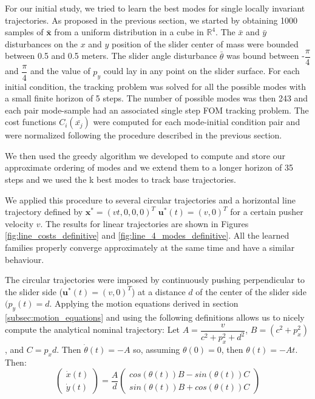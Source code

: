\documentclass[12,twoside]{TFG-GM}
\theoremstyle{definition}
\theoremstyle{remark}
\newcommand*\diff[1]{\bar{#1}}
\begin{document}
For our initial study, we tried to learn the best modes for single locally invariant trajectories. As proposed in the previous section, we started by obtaining 1000 samples of $\diff{\textbf{x}}$ from a uniform distribution in a cube in $\mathbb{R}^4$. The $\diff{x}$ and $\diff{y}$ disturbances on the $x$ and $y$ position of the slider center of mass were bounded between 0.5 and 0.5 meters. The slider angle disturbance $\diff{\theta}$ was bound between -$\dfrac{\pi}{4}$ and $\dfrac{\pi}{4}$ and the value of $p_y$ could lay in any point on the slider surface. For each initial condition, the tracking problem was solved for all the possible modes with a small finite horizon of 5 steps. The number of possible modes was then 243 and each pair mode-sample had an associated single step FOM tracking problem. The cost functions $C_i(\diff{x_j})$ were computed for each mode-initial condition pair and were normalized following the procedure described in the previous section.

We then used the greedy algorithm we developed to compute and store our approximate ordering of modes and we extend them to a longer horizon of 35 steps and we used the k best modes to track base trajectories.

We applied this procedure to several circular trajectories and a horizontal line trajectory defined by $\textbf{x}^* =(v t, 0, 0, 0)^T$ $\textbf{u}^*(t) = (v, 0)^T$ for a certain pusher velocity $v$. The results for linear trajectories are shown in Figures \ref{fig:line_costs_definitive} and \ref{fig:line_4_modes_definitive}. All the learned families properly converge approximately at the same time and have a similar behaviour.

The circular trajectories were imposed by continuously pushing perpendicular to the slider side ($\textbf{u}^*(t) = (v, 0)^T$) at a distance $d$ of the center of the slider side $(p_y(t) = d$.
Applying the motion equations derived in section \ref{subsec:motion_equations} and using the following definitions allows us to nicely compute the analytical nominal trajectory:
Let $A = \dfrac{v}{c^2 + p_x^2 + d^2}$, $B = (c^2 + p_x^2)$, and $C = p_x d$. Then $\dot{\theta}(t) = -A$ so, assuming $\theta(0) = 0$, then $\theta(t) = -At$. Then:
\begin{equation}
\begin{pmatrix} \dot{x}(t)\\ \dot{y}(t) \end{pmatrix} = \dfrac{A}{d}\begin{pmatrix}
cos(\theta(t))B - sin(\theta(t))C\\ sin(\theta(t))B + cos(\theta(t))C
\end{pmatrix}
\end{equation}
\end{document}
